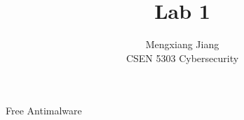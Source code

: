 \documentclass[12pt]{article}
\newenvironment{problem}[2][Problem]{\begin{trivlist}
\item[\hskip \labelsep {\bfseries #1}\hskip \labelsep {\bfseries #2.}]}{\end{trivlist}}
\begin{document}
 
 
\title{Lab 1}%
\author{Mengxiang Jiang\\ %
CSEN 5303 Cybersecurity} %
 
\maketitle
 
\begin{problem}{1} %
Free Antimalware


\end{problem}
\end{document}
